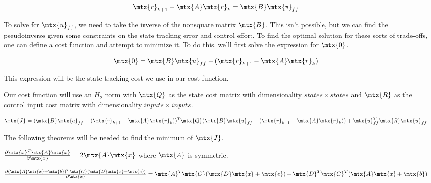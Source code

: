 \begin{equation*}
  \mtx{r}_{k+1} - \mtx{A}\mtx{r}_k = \mtx{B}\mtx{u}_{ff}
\end{equation*}

To solve for $\mtx{u}_{ff}$, we need to take the inverse of the nonsquare matrix
$\mtx{B}$. This isn't possible, but we can find the pseudoinverse given some
constraints on the \gls{state} \gls{tracking} error and \gls{control effort}. To
find the optimal solution for these sorts of trade-offs, one can define a cost
function and attempt to minimize it. To do this, we'll first solve the
expression for $\mtx{0}$.

\begin{equation*}
  \mtx{0} = \mtx{B}\mtx{u}_{ff} - (\mtx{r}_{k+1} - \mtx{A}\mtx{r}_k)
\end{equation*}

This expression will be the \gls{state} \gls{tracking} cost we use in our cost
function.

Our cost function will use an $H_2$ norm with $\mtx{Q}$ as the \gls{state} cost
matrix with dimensionality $states \times states$ and $\mtx{R}$ as the
\gls{control input} cost matrix with dimensionality $inputs \times inputs$.

\begin{equation*}
  \mtx{J} = (\mtx{B}\mtx{u}_{ff} - (\mtx{r}_{k+1} - \mtx{A}\mtx{r}_k))^T \mtx{Q}
    (\mtx{B}\mtx{u}_{ff} - (\mtx{r}_{k+1} - \mtx{A}\mtx{r}_k)) +
    \mtx{u}_{ff}^T\mtx{R}\mtx{u}_{ff}
\end{equation*}

The following theorems will be needed to find the minimum of $\mtx{J}$.

\begin{theorem}
  \label{thm:partial_xax}

  $\frac{\partial \mtx{x}^T\mtx{A}\mtx{x}}{\partial\mtx{x}} =
    2\mtx{A}\mtx{x}$ where $\mtx{A}$ is symmetric.
\end{theorem}

\begin{theorem}
  \label{thm:partial_ax_b}

  $\frac{\partial (\mtx{A}\mtx{x} + \mtx{b})^T\mtx{C}
    (\mtx{D}\mtx{x} + \mtx{e})}{\partial\mtx{x}} =
    \mtx{A}^T\mtx{C}(\mtx{D}\mtx{x} + \mtx{e}) + \mtx{D}^T\mtx{C}^T
    (\mtx{A}\mtx{x} + \mtx{b})$
\end{theorem}

